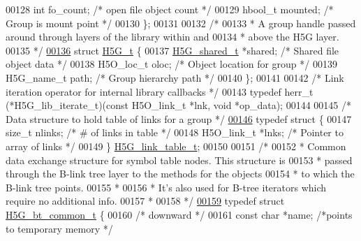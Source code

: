 \begin{DoxyCode}
00128     \textcolor{keywordtype}{int} fo\_count;                   \textcolor{comment}{/* open file object count */}
00129     hbool\_t mounted;                \textcolor{comment}{/* Group is mount point */}
00130 \};
00131 
00132 \textcolor{comment}{/*}
00133 \textcolor{comment}{ * A group handle passed around through layers of the library within and}
00134 \textcolor{comment}{ * above the H5G layer.}
00135 \textcolor{comment}{ */}
\hyperlink{struct_h5_g__t}{00136} \textcolor{keyword}{struct }\hyperlink{struct_h5_g__t}{H5G\_t} \{
00137     \hyperlink{struct_h5_g__shared__t}{H5G\_shared\_t} *shared;               \textcolor{comment}{/* Shared file object data */}
00138     H5O\_loc\_t oloc;                     \textcolor{comment}{/* Object location for group */}
00139     H5G\_name\_t path;                    \textcolor{comment}{/* Group hierarchy path   */}
00140 \};
00141 
00142 \textcolor{comment}{/* Link iteration operator for internal library callbacks */}
00143 \textcolor{keyword}{typedef} herr\_t (*H5G\_lib\_iterate\_t)(\textcolor{keyword}{const} H5O\_link\_t *lnk, \textcolor{keywordtype}{void} *op\_data);
00144 
00145 \textcolor{comment}{/* Data structure to hold table of links for a group */}
\hyperlink{struct_h5_g__link__table__t}{00146} \textcolor{keyword}{typedef} \textcolor{keyword}{struct }\{
00147     \textcolor{keywordtype}{size\_t}      nlinks;         \textcolor{comment}{/* # of links in table */}
00148     H5O\_link\_t *lnks;           \textcolor{comment}{/* Pointer to array of links */}
00149 \} \hyperlink{struct_h5_g__link__table__t}{H5G\_link\_table\_t};
00150 
00151 \textcolor{comment}{/*}
00152 \textcolor{comment}{ * Common data exchange structure for symbol table nodes.  This structure is}
00153 \textcolor{comment}{ * passed through the B-link tree layer to the methods for the objects}
00154 \textcolor{comment}{ * to which the B-link tree points.}
00155 \textcolor{comment}{ *}
00156 \textcolor{comment}{ * It's also used for B-tree iterators which require no additional info.}
00157 \textcolor{comment}{ *}
00158 \textcolor{comment}{ */}
\hyperlink{struct_h5_g__bt__common__t}{00159} \textcolor{keyword}{typedef} \textcolor{keyword}{struct }\hyperlink{struct_h5_g__bt__common__t}{H5G\_bt\_common\_t} \{
00160     \textcolor{comment}{/* downward */}
00161     \textcolor{keyword}{const} \textcolor{keywordtype}{char}  *name;                  \textcolor{comment}{/*points to temporary memory         */}

\end{DoxyCode}
